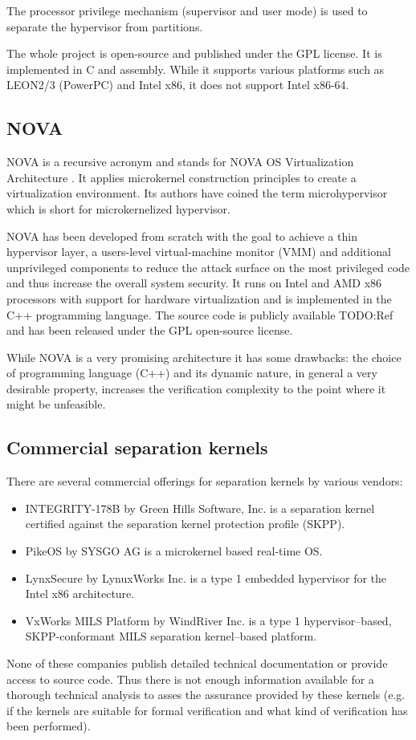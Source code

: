 The processor privilege mechanism (supervisor and user mode) is used to
separate the hypervisor from partitions.

The whole project is open-source and published under the GPL license. It is
implemented in C and assembly. While it supports various platforms such as
LEON2/3 (PowerPC) and Intel x86, it does not support Intel x86-64.

\subsection{NOVA}
NOVA is a recursive acronym and stands for NOVA OS Virtualization Architecture
\cite{Steinberg:2010:NMS:1755913.1755935}. It applies microkernel construction
principles to create a virtualization environment. Its authors have coined
the term microhypervisor which is short for
microkernelized hypervisor.

NOVA has been developed from scratch with the goal to achieve a thin hypervisor
layer, a users-level virtual-machine monitor (VMM) and additional unprivileged
components to reduce the attack surface on the most privileged code and thus
increase the overall system security. It runs on Intel and AMD x86 processors
with support for hardware virtualization and is implemented in the C++
programming language. The source code is publicly available TODO:Ref and has
been released under the GPL open-source license.

While NOVA is a very promising architecture it has some drawbacks: the choice of
programming language (C++) and its dynamic nature, in general a very desirable
property, increases the verification complexity to the point where it might be
unfeasible.

\subsection{Commercial separation kernels}\label{subsec:commercial-sks}
There are several commercial offerings for separation kernels by various
vendors:

\begin{itemize}
	\item INTEGRITY-178B by Green Hills Software, Inc. is a separation kernel
		certified against the separation kernel protection profile (SKPP).
	\item PikeOS by SYSGO AG is a microkernel based real-time OS.
	\item LynxSecure by LynuxWorks Inc. is a type 1 embedded hypervisor for the
		Intel x86 architecture.
	\item VxWorks MILS Platform by WindRiver Inc. is a type 1 hypervisor–based,
		SKPP-conformant MILS separation kernel–based platform.
\end{itemize}

None of these companies publish detailed technical documentation or provide
access to source code. Thus there is not enough information available for a
thorough technical analysis to asses the assurance provided by these kernels
(e.g. if the kernels are suitable for formal verification and what kind of
verification has been performed).
